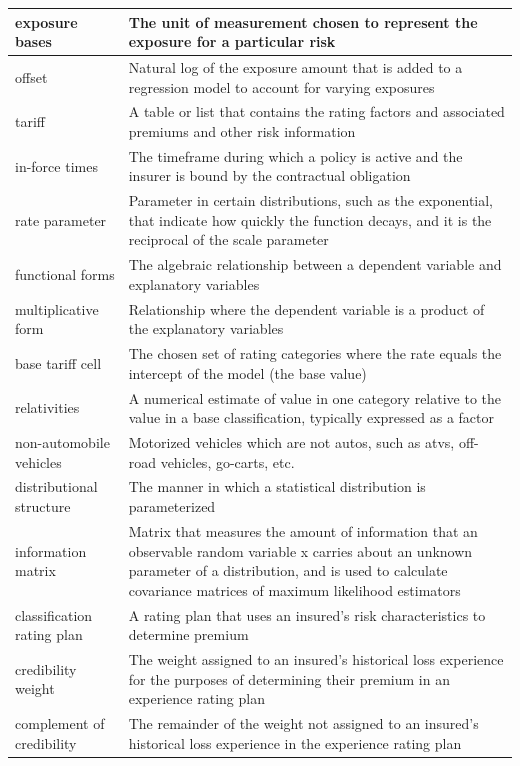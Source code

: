 \documentclass[
]{book}
\begin{document}
\begin{longtable}{>{\raggedright\arraybackslash}p{10em}|>{\raggedright\arraybackslash}p{30em}}
\hline
exposure bases & The unit of measurement chosen to represent the exposure for a particular risk\\
\hline
offset & Natural log of the exposure amount that is added to a regression model to account for varying exposures\\
\hline
tariff & A table or list that contains the rating factors and associated premiums and other risk information\\
\hline
in-force times & The timeframe during which a policy is active and the insurer is bound by the contractual obligation\\
\hline
rate parameter & Parameter in certain distributions, such as the exponential, that indicate how quickly the function decays, and it is the reciprocal of the scale parameter\\
\hline
functional forms & The algebraic relationship between a dependent variable and explanatory variables\\
\hline
multiplicative form & Relationship where the dependent variable is a product of the explanatory variables\\
\hline
base tariff cell & The chosen set of rating categories where the rate equals the intercept of the model (the base value)\\
\hline
relativities & A numerical estimate of value in one category relative to the value in a base classification, typically expressed as a factor\\
\hline
non-automobile vehicles & Motorized vehicles which are not autos, such as atvs, off-road vehicles, go-carts, etc.\\
\hline
distributional structure & The manner in which a statistical distribution is parameterized\\
\hline
information matrix & Matrix that measures the amount of information that an observable random variable x carries about an unknown parameter of a distribution, and is used to calculate covariance matrices of maximum likelihood estimators\\
\hline
classification rating plan & A rating plan that uses an insured's risk characteristics to determine premium\\
\hline
credibility weight & The weight assigned to an insured's historical loss experience for the purposes of determining their premium in an experience rating plan\\
\hline
complement of credibility & The remainder of the weight not assigned to an insured's historical loss experience in the experience rating plan\\

\end{longtable}
\end{document}
